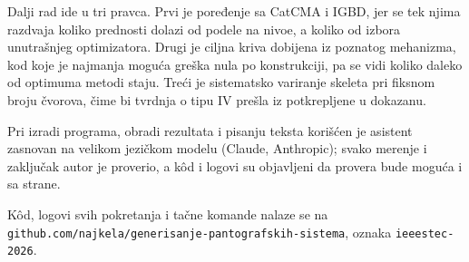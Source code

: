 \documentclass[
  conference,
  a4paper,
  10pt]{IEEEtran}
\begin{document}
Dalji rad ide u tri pravca. Prvi je poređenje sa CatCMA i IGBD, jer se
tek njima razdvaja koliko prednosti dolazi od podele na nivoe, a koliko
od izbora unutrašnjeg optimizatora. Drugi je ciljna kriva dobijena iz
poznatog mehanizma, kod koje je najmanja moguća greška nula po
konstrukciji, pa se vidi koliko daleko od optimuma metodi staju. Treći
je sistematsko variranje skeleta pri fiksnom broju čvorova, čime bi
tvrdnja o tipu IV prešla iz potkrepljene u dokazanu.

Pri izradi programa, obradi rezultata i pisanju teksta korišćen je
asistent zasnovan na velikom jezičkom modelu (Claude, Anthropic); svako
merenje i zaključak autor je proverio, a kôd i logovi su objavljeni da
provera bude moguća i sa strane.

Kôd, logovi svih pokretanja i tačne komande nalaze se na
\texttt{github.com/najkela/generisanje-pantografskih-sistema}, oznaka
\texttt{ieeestec-2026}.

  \scriptsize
\end{document}
